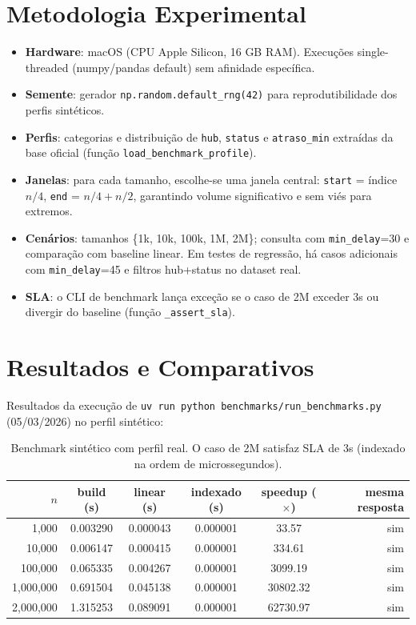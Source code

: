 \documentclass[12pt]{article}
\begin{document}
\section{Metodologia Experimental}
\begin{itemize}
  \item \textbf{Hardware}: macOS (CPU Apple Silicon, 16 GB RAM). Execuções single-threaded (numpy/pandas default) sem afinidade específica.
  \item \textbf{Semente}: gerador \texttt{np.random.default\_rng(42)} para reprodutibilidade dos perfis sintéticos.
  \item \textbf{Perfis}: categorias e distribuição de \texttt{hub}, \texttt{status} e \texttt{atraso\_min} extraídas da base oficial (função \texttt{load\_benchmark\_profile}).
  \item \textbf{Janelas}: para cada tamanho, escolhe-se uma janela central: \texttt{start} = índice $n/4$, \texttt{end} = $n/4 + n/2$, garantindo volume significativo e sem viés para extremos.
  \item \textbf{Cenários}: tamanhos \{1k, 10k, 100k, 1M, 2M\}; consulta com \texttt{min\_delay}=30 e comparação com baseline linear. Em testes de regressão, há casos adicionais com \texttt{min\_delay}=45 e filtros hub+status no dataset real.
  \item \textbf{SLA}: o CLI de benchmark lança exceção se o caso de 2M exceder 3s ou divergir do baseline (função \texttt{\_assert\_sla}).
\end{itemize}

\section{Resultados e Comparativos}
Resultados da execução de \texttt{uv run python benchmarks/run\_benchmarks.py} (05/03/2026) no perfil sintético:

\begin{table}[H]
  \centering
  \begin{tabular}{@{}rccccr@{}}
    \toprule
    $n$ & build (s) & linear (s) & indexado (s) & speedup ($\times$) & mesma resposta \\
    \midrule
    1{,}000    & 0.003290 & 0.000043 & 0.000001 & 33.57  & sim \\
    10{,}000   & 0.006147 & 0.000415 & 0.000001 & 334.61 & sim \\
    100{,}000  & 0.065335 & 0.004267 & 0.000001 & 3099.19 & sim \\
    1{,}000{,}000 & 0.691504 & 0.045138 & 0.000001 & 30802.32 & sim \\
    2{,}000{,}000 & 1.315253 & 0.089091 & 0.000001 & 62730.97 & sim \\
    \bottomrule
  \end{tabular}
  \caption{Benchmark sintético com perfil real. O caso de 2M satisfaz SLA de 3s (indexado na ordem de microssegundos).}
\end{table}
\end{document}
